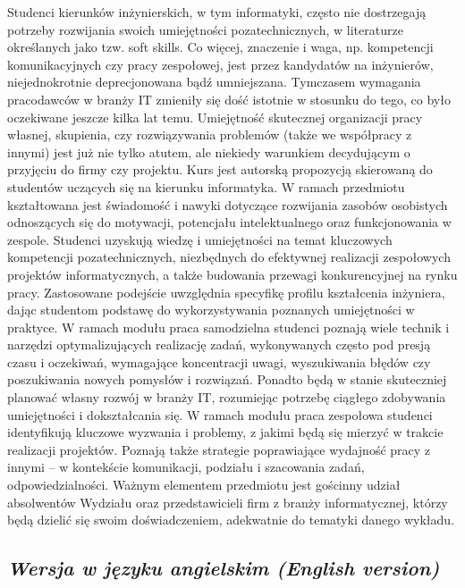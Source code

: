 \documentclass[12pt, a4paper]{article}
\begin{document}
Studenci kierunków inżynierskich, w tym informatyki, często nie dostrzegają potrzeby rozwijania swoich umiejętności pozatechnicznych, w literaturze określanych jako tzw. soft skills. Co więcej, znaczenie i waga, np. kompetencji komunikacyjnych czy pracy zespołowej, jest przez kandydatów na inżynierów, niejednokrotnie deprecjonowana bądź umniejszana. Tymczasem wymagania pracodawców w branży IT zmieniły się dość istotnie w stosunku do tego, co było oczekiwane jeszcze kilka lat temu. Umiejętność skutecznej organizacji pracy własnej, skupienia, czy rozwiązywania problemów (także we współpracy z innymi) jest już nie tylko atutem, ale niekiedy warunkiem decydującym o przyjęciu do firmy czy projektu. Kurs jest autorską propozycją skierowaną do studentów uczących się na kierunku informatyka. W ramach przedmiotu kształtowana jest świadomość i nawyki dotyczące rozwijania zasobów osobistych odnoszących się do motywacji, potencjału intelektualnego oraz funkcjonowania w zespole. Studenci uzyskują wiedzę i umiejętności na temat kluczowych kompetencji pozatechnicznych, niezbędnych do efektywnej realizacji zespołowych projektów informatycznych, a także budowania przewagi konkurencyjnej na rynku pracy. Zastosowane podejście uwzględnia specyfikę profilu kształcenia inżyniera, dając studentom podstawę do wykorzystywania poznanych umiejętności w praktyce. W ramach modułu praca samodzielna studenci poznają wiele technik i narzędzi optymalizujących realizację zadań, wykonywanych często pod presją czasu i oczekiwań, wymagające koncentracji uwagi, wyszukiwania błędów czy poszukiwania nowych pomysłów i rozwiązań. Ponadto będą w stanie skuteczniej planować własny rozwój w branży IT, rozumiejąc potrzebę ciągłego zdobywania umiejętności i dokształcania się. W ramach modułu praca zespołowa studenci identyfikują kluczowe wyzwania i problemy, z jakimi będą się mierzyć w trakcie realizacji projektów. Poznają także strategie poprawiające wydajność pracy z innymi – w kontekście komunikacji, podziału i szacowania zadań, odpowiedzialności. Ważnym elementem przedmiotu jest gościnny udział absolwentów Wydziału oraz przedstawicieli firm z branży informatycznej, którzy będą dzielić się swoim doświadczeniem, adekwatnie do tematyki danego wykładu.

\subsection*{\textit{Wersja w języku angielskim (English version)}}
\end{document}
